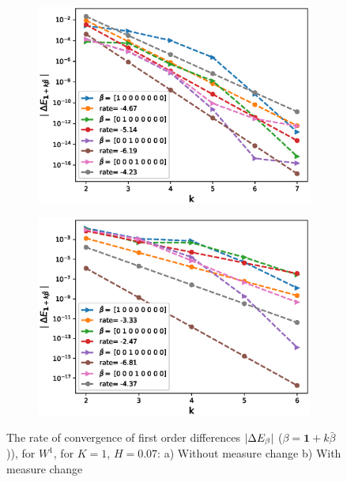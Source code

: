 \documentclass[11pt]{article}
\begin{document}
 \begin{figure}[h!]
 	\centering
 	\begin{subfigure}{.4\textwidth}
 		\centering
 		\includegraphics[width=1\linewidth]{./figures/rBergomi_mixed_error_rates/without_change_measure/N_4/H_007/first_difference_rbergomi_4steps_H_007_K_1_totally_hierarch_with_rate_W1}
 		\caption{}
 		\label{fig:sub3}
 	\end{subfigure}%
 	\begin{subfigure}{.4\textwidth}
 		\centering
 		\includegraphics[width=1\linewidth]{./figures/rBergomi_mixed_error_rates/partial_change_measure/N_4/H_007/first_difference_rbergomi_4steps_H_007_K_1_totally_hierarch_with_rate_W1_change_measure_part_spec}
 		\caption{}
 		\label{fig:sub4}
 	\end{subfigure}
 	
 	\caption{The rate of convergence of  first order differences $\left\lvert\Delta E_{\beta}\right\rvert$ ($\beta=\mathbf{1}+k \bar{\beta}$)), for $W^1$, for $K=1$, $H=0.07$: a) Without measure change b) With measure change}
 	\label{fig:first_diff_comp_K_1_H_007_W_1}
 \end{figure}
 
\end{document}
